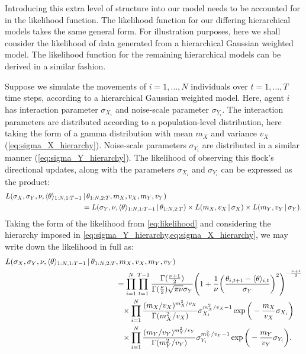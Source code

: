 Introducing this extra level of structure into our model needs to be accounted
for in the likelihood function. The likelihood function for our differing
hierarchical models takes the same general form. For illustration purposes,
here we shall consider the likelihood of data generated from a hierarchical
Gaussian weighted model. The likelihood function for the remaining hierarchical
models can be derived in a similar fashion.

Suppose we simulate the movements of $i=1,\ldots,N$ individuals over
$t=1,\ldots,T$ time steps, according to a hierarchical Gaussian weighted model.
Here, agent $i$ has interaction parameter $\sigma_{X_i}$ and noise-scale
parameter $\sigma_{Y_i}$. The interaction parameters are distributed according
to a population-level distribution, here taking the form of a gamma
distribution with mean $m_X$ and variance $v_X$ (\cref{eq:sigma_X_hierarchy}).
Noise-scale parameters $\sigma_{Y_i}$ are distributed in a similar manner
(\cref{eq:sigma_Y_hierarchy}). The likelihood of observing this flock's
directional updates, along with the parameters $\sigma_{X_i}$ and
$\sigma_{Y_i}$ can be expressed as the product:
\begin{align}
  \label{eq:hier_likelihood}
  \begin{split}
      L(\sigma_X, \sigma_Y, \nu, \langle\theta\rangle_{1:N,1:T-1} &\,|\, \theta_{1:N,2:T},
    m_X, v_X, m_Y, v_Y) \\
    &= L(\sigma_Y, \nu, \langle\theta\rangle_{1:N,1:T-1} \,|\, \theta_{1:N,2:T}) \times
    L(m_X, v_X \,|\, \sigma_X)
    \times
    L(m_Y, v_Y \,|\, \sigma_Y).
  \end{split}
\end{align}
Taking the form of the likelihood from \cref{eq:likelihood} and considering the
hierarchy imposed in \cref{eq:sigma_Y_hierarchy,eq:sigma_X_hierarchy}, we may
write down the likelihood in full as:
\begin{align}
  \begin{split}
      L(\sigma_X, \sigma_Y, \nu, \langle\theta\rangle_{1:N,1:T-1} \,|\, \theta_{1:N,2:T}&,
    m_X, v_X, m_Y, v_Y) \\
    &= \prod_{i=1}^N \prod_{t=1}^{T-1}
    \frac{\Gamma(\frac{\nu +1 }{2})}{\Gamma(\frac{\nu}{2})\sqrt{\pi\nu}\sigma_Y}
    \Bigg(1 + \frac{1}{\nu}
    \bigg(\frac{\theta_{i,t+1}-\langle\theta\rangle_{i,t}}{\sigma_Y}\bigg)^2
    \Bigg)^{-\frac{\nu+1}{2}}\\
    &\hphantom{=}\times\prod_{i=1}^N \frac{(m_X / v_X)^{m_X^2 / v_X}}{\Gamma(m_X^2/v_X)}
        \sigma_{X_i}^{m_X^2/v_X - 1} \exp\bigg(-\frac{m_X}{v_X}\sigma_{X_i}\bigg)\\
    &\hphantom{=}\times\prod_{i=1}^N \frac{(m_Y / v_Y)^{m_Y^2 / v_Y}}{\Gamma(m_Y^2/v_Y)}
        \sigma_{Y_i}^{m_Y^2/v_Y - 1} \exp\bigg(-\frac{m_Y}{v_Y}\sigma_{Y_i}\bigg).\\
  \end{split}
\end{align}


